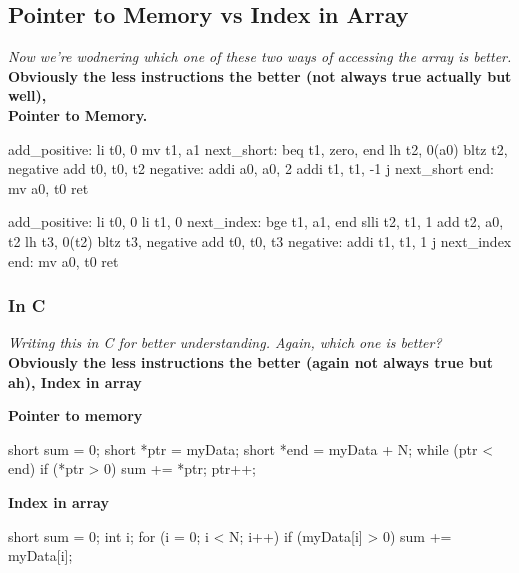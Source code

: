 \subsection{Pointer to Memory vs Index in Array}
\textit{Now we're wodnering which one of these two ways of accessing the array is better.} \\
\textbf{Obviously the less instructions the better (not always true actually but well),\\ Pointer to Memory.} \\
\begin{minipage}[htpb]{0.45\textwidth}
\begin{assembly}
add_positive:
    li t0, 0
    mv t1, a1
next_short:
    beq t1, zero, end
    lh t2, 0(a0)
    bltz t2, negative
    add t0, t0, t2
negative:
    addi a0, a0, 2
    addi t1, t1, -1
    j next_short
end:
    mv a0, t0
ret
\end{assembly}
\end{minipage}
\hfill
\vline
\hfill
\begin{minipage}[htp]{0.45\textwidth}
\begin{assembly}
add_positive:
    li t0, 0
    li t1, 0
next_index:
    bge t1, a1, end
    slli t2, t1, 1
    add t2, a0, t2
    lh t3, 0(t2)
    bltz t3, negative
    add t0, t0, t3
negative:
    addi t1, t1, 1
    j next_index
end:
    mv a0, t0
ret
\end{assembly}
\end{minipage}
\newpage
\subsubsection{In C}
\textit{Writing this in C for better understanding. Again, which one is better?} \\
\vspace*{5px}
\textbf{Obviously the less instructions the better (again not always true but ah), Index in array} \\
\begin{minipage}[htp]{0.45\textwidth}
\textbf{Pointer to memory} \\
\begin{cc}
short sum = 0;
short *ptr = myData;
short *end = myData + N;
while (ptr < end) {
    if (*ptr > 0) {
    sum += *ptr;
}
    ptr++;
}
\end{cc}
\end{minipage}
\hfill
\vline
\hfill
\begin{minipage}[htp]{0.45\textwidth}
\textbf{Index in array} \\
\begin{cc}
short sum = 0;
int i;
for (i = 0; i < N; i++) {
    if (myData[i] > 0) {
    sum += myData[i];
}
}
\end{cc}
\end{minipage}

